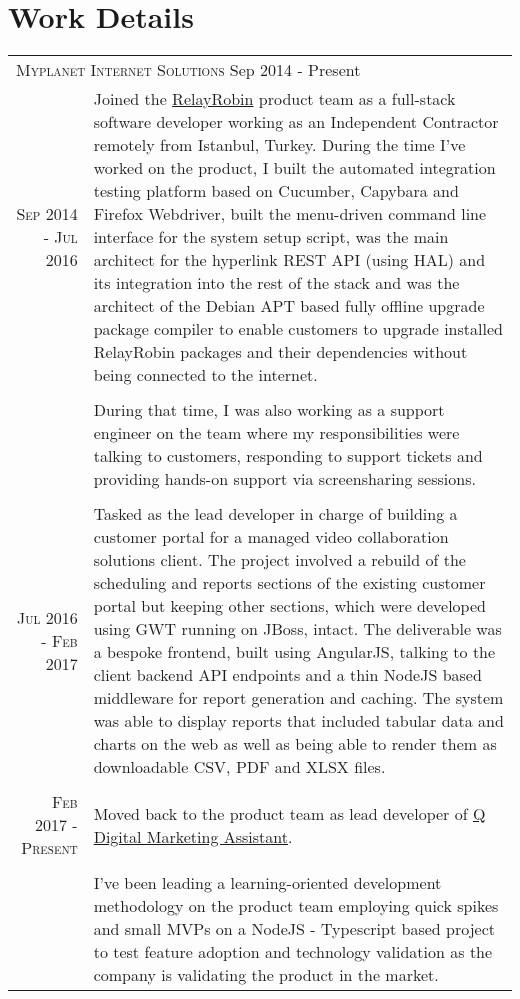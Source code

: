 \documentclass[a4paper,10pt]{article}
\newcommand{\exptitle}[2]{
  \multicolumn{2}{l}{\textsc{#1} \footnotesize{#2}} \\
  \specialrule{.01em}{0.5em}{1em}
}
\begin{document}
\section{Work Details}
\begin{longtable}{r|p{11cm}}
  \exptitle{Myplanet Internet Solutions}{Sep 2014 - Present}

  \textsc{Sep 2014 - Jul 2016}   & Joined the \href{http://relayrobin.com}{RelayRobin} product team as a full-stack software developer working as an Independent Contractor remotely from Istanbul, Turkey. During the time I've worked on the product, I built the automated integration testing platform based on Cucumber, Capybara and Firefox Webdriver, built the menu-driven command line interface for the system setup script, was the main architect for the hyperlink REST API (using HAL) and its integration into the rest of the stack and was the architect of the Debian APT based fully offline upgrade package compiler to enable customers to upgrade installed RelayRobin packages and their dependencies without being connected to the internet. \\
                                & \\
                                & During that time, I was also working as a support engineer on the team where my responsibilities were talking to customers, responding to support tickets and providing hands-on support via screensharing sessions. \\
  \multicolumn{2}{c}{} \\
  \textsc{Jul 2016 - Feb 2017}  & Tasked as the lead developer in charge of building a customer portal for a managed video collaboration solutions client. The project involved a rebuild of the scheduling and reports sections of the existing customer portal but keeping other sections, which were developed using GWT running on JBoss, intact. The deliverable was a bespoke frontend, built using AngularJS, talking to the client backend API endpoints and a thin NodeJS based middleware for report generation and caching. The system was able to display reports that included tabular data and charts on the web as well as being able to render them as downloadable CSV, PDF and XLSX files.  \\

  \multicolumn{2}{c}{} \\
  \textsc{Feb 2017 - Present}   & Moved back to the product team as lead developer of \href{http://askq.io/}{Q Digital Marketing Assistant}. \\
                                & \\
   & I've been leading a learning-oriented development methodology on the product team employing quick spikes and small MVPs on a NodeJS - Typescript based project to test feature adoption and technology validation as the company is validating the product in the market. \\


\end{longtable}
\end{document}
